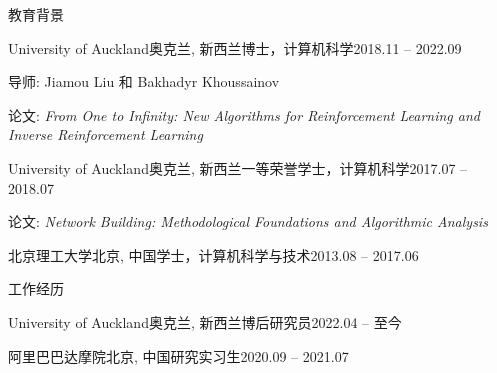 \documentclass{resume} %
\begin{document}

\begin{rSection}{教育背景}

\begin{rSubsection}{University of Auckland}{奥克兰, 新西兰}{博士，计算机科学}{2018.11 -- 2022.09}%
\item 导师: Jiamou Liu 和 Bakhadyr Khoussainov
\item 论文: {\em From One to Infinity: New Algorithms for Reinforcement Learning and Inverse Reinforcement Learning}
\end{rSubsection}

\begin{rSubsection}{University of Auckland}{奥克兰, 新西兰}{一等荣誉学士，计算机科学}{2017.07 -- 2018.07}
\item 论文: {\em Network Building: Methodological Foundations and Algorithmic Analysis}
\end{rSubsection}

\begin{rSubsection}{北京理工大学}{北京, 中国}{学士，计算机科学与技术}{2013.08 -- 2017.06}
\end{rSubsection}
\end{rSection}


\begin{rSection}{工作经历}
\begin{rSubsection}{University of Auckland}{奥克兰, 新西兰}{博后研究员}{2022.04 -- 至今}
\end{rSubsection}
	\begin{rSubsection}{阿里巴巴达摩院}{北京, 中国}{研究实习生}{2020.09 -- 2021.07}
\end{rSubsection}
\end{rSection}
\end{document}
